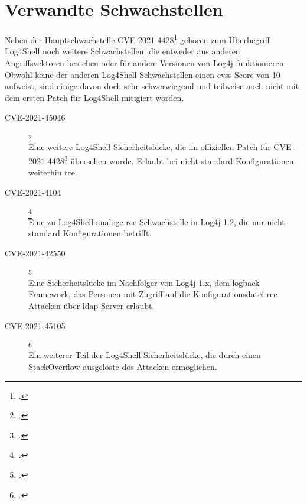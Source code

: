 
\section{Verwandte Schwachstellen}\label{sec:similarCVEs}
Neben der Hauptschwachstelle CVE-2021-4428\footcite{44228} gehören zum Überbegriff Log4Shell noch weitere Schwachstellen, die entweder aus anderen Angriffsvektoren bestehen oder für andere Versionen von Log4j funktionieren.
Obwohl keine der anderen Log4Shell Schwachstellen einen \gls{cvss} Score von 10 aufweist, sind einige davon doch sehr schwerwiegend und teilweise auch nicht mit dem ersten Patch für Log4Shell mitigiert worden.

\begin{description}
    \item[CVE-2021-45046]\label{itm:cve-2021-45046}\footcite{45046}\hfill \\
    Eine weitere Log4Shell Sicherheitslücke, die im offiziellen Patch für CVE-2021-4428\footcite{44228} übersehen wurde.
    Erlaubt bei nicht-standard Konfigurationen weiterhin \gls{rce}.

    \item[CVE-2021-4104]\footcite{4104}\hfill \\
    Eine zu Log4Shell analoge \gls{rce} Schwachstelle in Log4j 1.2, die nur nicht-standard Konfigurationen betrifft.

    \item[CVE-2021-42550]\footcite{42550}\hfill \\
    Eine Sicherheitslücke im Nachfolger von Log4j 1.x, dem logback Framework, das Personen mit Zugriff auf die Konfigurationsdatei \gls{rce} Attacken über \gls{ldap} Server erlaubt.

    \item[CVE-2021-45105]\footcite{45105}\hfill \\
    Ein weiterer Teil der Log4Shell Sicherheitslücke, die durch einen StackOverflow ausgelöste \gls{dos} Attacken ermöglichen.
\end{description}
